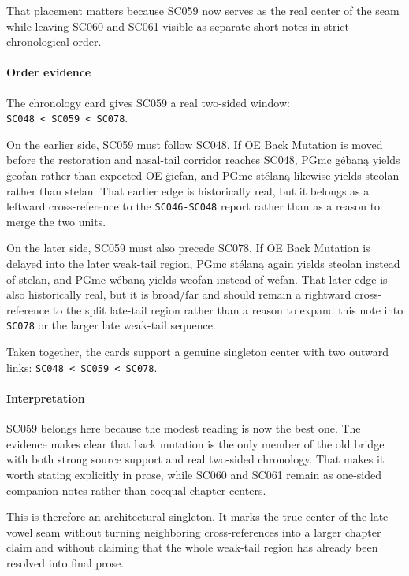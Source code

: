 \documentclass[
  british,
  a4paper,
]{article}
\begin{document}
That placement matters because SC059 now serves as the real center of
the seam while leaving SC060 and SC061 visible as separate short notes
in strict chronological order.

\paragraph{Order evidence}\label{order-evidence-37}

The chronology card gives SC059 a real two-sided window:
\texttt{SC048\ \textless{}\ SC059\ \textless{}\ SC078}.

On the earlier side, SC059 must follow SC048. If OE Back Mutation is
moved before the restoration and nasal-tail corridor reaches SC048, PGmc
gébaną yields ġeofan rather than expected OE ġiefan, and PGmc stélaną
likewise yields steolan rather than stelan. That earlier edge is
historically real, but it belongs as a leftward cross-reference to the
\texttt{SC046-SC048} report rather than as a reason to merge the two
units.

On the later side, SC059 must also precede SC078. If OE Back Mutation is
delayed into the later weak-tail region, PGmc stélaną again yields
steolan instead of stelan, and PGmc wébaną yields weofan instead of
wefan. That later edge is also historically real, but it is broad/far
and should remain a rightward cross-reference to the split late-tail
region rather than a reason to expand this note into \texttt{SC078} or
the larger late weak-tail sequence.

Taken together, the cards support a genuine singleton center with two
outward links: \texttt{SC048\ \textless{}\ SC059\ \textless{}\ SC078}.

\paragraph{Interpretation}\label{interpretation-37}

SC059 belongs here because the modest reading is now the best one. The
evidence makes clear that back mutation is the only member of the old
bridge with both strong source support and real two-sided chronology.
That makes it worth stating explicitly in prose, while SC060 and SC061
remain as one-sided companion notes rather than coequal chapter centers.

This is therefore an architectural singleton. It marks the true center
of the late vowel seam without turning neighboring cross-references into
a larger chapter claim and without claiming that the whole weak-tail
region has already been resolved into final prose.
\end{document}
